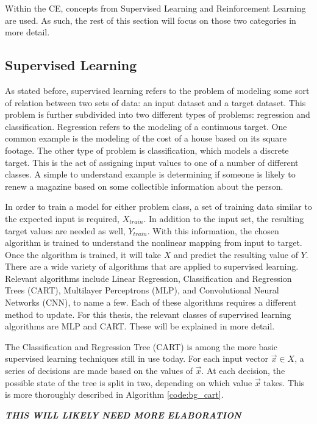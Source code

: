 \documentclass[11pt]{report}
\begin{document}
	\par Within the CE, concepts from Supervised Learning and Reinforcement Learning are used. As such, the rest of this section will focus on those two categories in more detail. 
	\subsection{Supervised Learning}
	\par As stated before, supervised learning refers to the problem of modeling some sort of relation between two sets of data: an input dataset and a target dataset. This problem is further subdivided into two different types of problems: regression and classification. Regression refers to the modeling of a continuous target. One common example is the modeling of the cost of a house based on its square footage. The other type of problem is classification, which models a discrete target. This is the act of assigning input values to one of a number of different classes. A simple to understand example is determining if someone is likely to renew a magazine based on some collectible information about the person.  
	\par In order to train a model for either problem class, a set of training data similar to the expected input is required, $X_{train}$. In addition to the input set, the resulting target values are needed as well, $Y_{train}$. With this information, the chosen algorithm is trained to understand the nonlinear mapping from input to target. Once the algorithm is trained, it will take $X$ and predict the resulting value of $Y$. There are a wide variety of algorithms that are applied to supervised learning. Relevant algorithms include Linear Regression, Classification and Regression Trees (CART), Multilayer Perceptrons (MLP), and Convolutional Neural Networks (CNN), to name a few. Each of these algorithms requires a different method to update. For this thesis, the relevant classes of supervised learning algorithms are MLP and CART. These will be explained in more detail.
	\par The Classification and Regression Tree (CART) is among the more basic supervised learning techniques still in use today. For each input vector $\vec{x} \in X$, a series of decisions are made based on the values of $\vec{x}$. At each decision, the possible state of the tree is split in two, depending on which value $\vec{x}$ takes. This is more thoroughly described in Algorithm \ref{code:bg_cart}.
	\par \textbf{\textit{THIS WILL LIKELY NEED MORE ELABORATION}}
\end{document}
